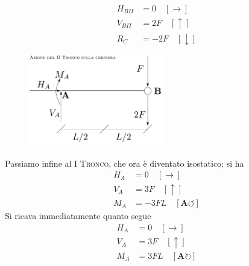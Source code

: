 \begin{align*}
H_{BII} &= 0 \quad [\to] \\ 
V_{BII} &= 2F \quad [\uparrow] \\
R_{C} &=-2F \quad [\downarrow]
\end{align*}
\renewcommand{\thefigure}{8.1~-~4}
\begin{figure}[ht]
\centering
\includegraphics[width=0.525\textwidth]{Immagini/Parte_8/Esercizio8_1/Esercizio8_1_6.pdf}
\caption{}
\label{Esercizio8-1-4}
\end{figure}
Passiamo infine al \textsc{I Tronco}, che ora è diventato isostatico; si ha
\begin{align*}
H_{A} &= 0 \quad [\to] \\ 
V_{A} &= 3F \quad [\uparrow] \\
M_{A} &=-3FL \quad [\mathbf{A}\circlearrowleft]
\end{align*}
Si ricava immediatamente  quanto segue
\begin{align*}
H_{A} &= 0 \quad [\to] \\ 
V_{A} &= 3F \quad [\uparrow] \\
M_{A} &=3FL \quad [\mathbf{A}\circlearrowright]
\end{align*}
